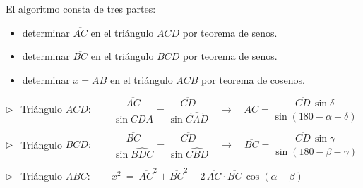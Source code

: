 El algoritmo consta de tres partes: 

\vspace{-2mm} \begin{itemize}
\vspace{-2mm} \item determinar $\overline{AC}$ en el triángulo $ACD$ por teorema de senos.
\vspace{-2mm} \item determinar $\overline{BC}$ en el triángulo $BCD$ por teorema de senos.
\vspace{-2mm} \item determinar $x=\overline{AB}$ en el triángulo $ACB$ por teorema de cosenos.
\end{itemize}

 $\triangleright \ \ $ Triángulo $ACD:\qquad \dfrac{\overline{AC}}{\sin \widehat{CDA}}=\dfrac{\overline{CD}}{\sin \widehat{CAD}} \quad \to \quad \overline{AC}=\dfrac{\overline{CD}\,\sin \delta}{\sin (180-\alpha-\delta)}$

 $\triangleright \ \ $ Triángulo $BCD:\qquad \dfrac{\overline{BC}}{\sin \widehat{BDC}}=\dfrac{\overline{CD}}{\sin \widehat{CBD}} \quad \to \quad \overline{BC}=\dfrac{\overline{CD}\, \sin \gamma}{\sin (180-\beta-\gamma)}$
 
 $\triangleright \ \ $ Triángulo $ABC:\qquad x^2\ =\ \overline{AC}^2+\overline{BC}^2-2\, \overline{AC} \cdot \overline{BC} \, \cos(\alpha-\beta)$



\vspace{1cm}


